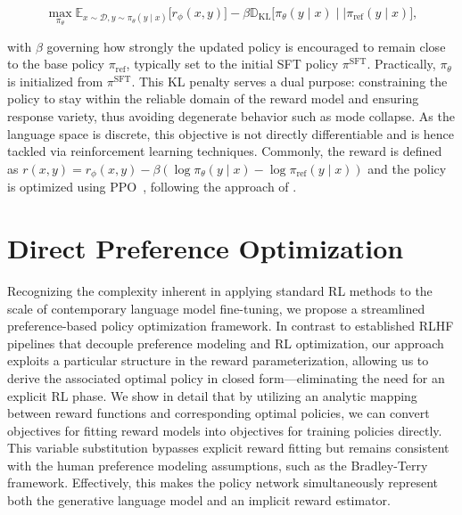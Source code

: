 \begin{equation}\label{eq:RL}
\max_{\pi_{\theta}}  \mathbb{E}_{x\sim \mathcal{D}, y\sim \pi_{\theta}(y \mid x)}\bigl[r_{\phi}(x, y)\bigr] - \beta\mathbb{D}_{\textrm{KL}}\bigl[\pi_{\theta}(y\mid x)\mid \mid \pi_\text{ref}(y\mid x)\bigr],
\end{equation}

with $\beta$ governing how strongly the updated policy is encouraged to remain close to the base policy $\pi_\text{ref}$, typically set to the initial SFT policy $\pi^\text{SFT}$. 
Practically, $\pi_\theta$ is initialized from $\pi^\text{SFT}$. This KL penalty serves a dual purpose: constraining the policy to stay within the reliable domain of the reward model and ensuring response variety, thus avoiding degenerate behavior such as mode collapse. As the language space is discrete, this objective is not directly differentiable and is hence tackled via reinforcement learning techniques. Commonly, the reward is defined as ${r(x, y) = r_{\phi}(x, y) -\beta (\log \pi_{\theta}(y\mid x) - \log \pi_\text{ref}(y\mid x))}$ and the policy is optimized using PPO~\cite{schulman2017proximal}, following the approach of \cite{ziegler2020finetuning, stiennon2022learning, bai2022training, ouyang2022training}.

\section{Direct Preference Optimization}\label{sec:DPO}

Recognizing the complexity inherent in applying standard RL methods to the scale of contemporary language model fine-tuning, we propose a streamlined preference-based policy optimization framework. In contrast to established RLHF pipelines that decouple preference modeling and RL optimization, our approach exploits a particular structure in the reward parameterization, allowing us to derive the associated optimal policy in closed form—eliminating the need for an explicit RL phase. We show in detail that by utilizing an analytic mapping between reward functions and corresponding optimal policies, we can convert objectives for fitting reward models into objectives for training policies directly. This variable substitution bypasses explicit reward fitting but remains consistent with the human preference modeling assumptions, such as the Bradley-Terry framework. Effectively, this makes the policy network simultaneously represent both the generative language model and an implicit reward estimator.

